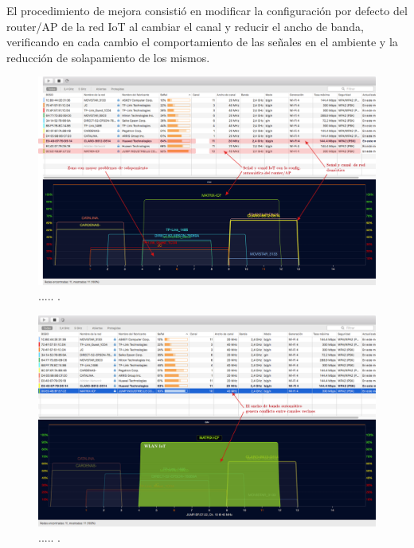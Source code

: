 El procedimiento de mejora consistió en modificar la configuración por defecto del router/AP de la red IoT al cambiar el canal y reducir el ancho de banda, verificando en cada cambio el comportamiento de las señales en el ambiente y la reducción de solapamiento de los mismos.

\begin{landscape} %
\begin{figure}[htpb]
\centering 
\includegraphics[width=1.5\textwidth]{./Figures/wifi/01.png}
\caption{..... .}
\label{fig:test01}
\end{figure}
\end{landscape} %


\begin{landscape} %
\begin{figure}[htpb]
\centering 
\includegraphics[width=1.5\textwidth]{./Figures/wifi/02.png}
\caption{..... .}
\label{fig:test02}
\end{figure}
\end{landscape} %


